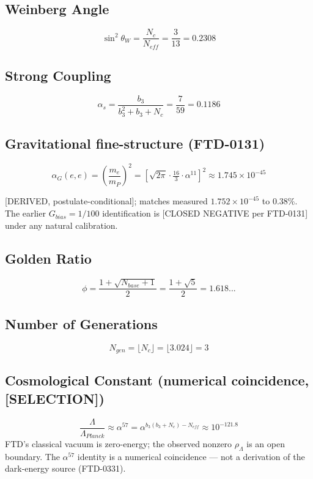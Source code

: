 \documentclass[
  11pt,
  letterpaper,
  twoside,
  openany]{book}
\makeatletter
\let\orig@subsection\subsection
\renewcommand{\subsection}{\needspace{6\baselineskip}\orig@subsection}
\makeatother
\begin{document}
\subsection{Weinberg Angle}\label{weinberg-angle}

\[
\sin^2\theta_W = \frac{N_c}{N_{eff}} = \frac{3}{13} = 0.2308
\]

\subsection{Strong Coupling}\label{strong-coupling}

\[
\alpha_s = \frac{b_3}{b_3^2 + b_3 + N_c} = \frac{7}{59} = 0.1186
\]

\subsection{Gravitational fine-structure
(FTD-0131)}\label{gravitational-fine-structure-ftd-0131-1}

\[
\alpha_G(e,e) = \left(\frac{m_e}{m_P}\right)^2 = \left[\sqrt{2\pi}\cdot\tfrac{16}{3}\cdot\alpha^{11}\right]^2 \approx 1.745 \times 10^{-45}
\]

{[}DERIVED, postulate-conditional{]}; matches measured
\(1.752 \times 10^{-45}\) to 0.38\%. The earlier \(G_{bias} = 1/100\)
identification is {[}CLOSED NEGATIVE per FTD-0131{]} under any natural
calibration.

\subsection{Golden Ratio}\label{golden-ratio}

\[
\phi = \frac{1 + \sqrt{N_{base}+1}}{2} = \frac{1+\sqrt{5}}{2} = 1.618...
\]

\subsection{Number of Generations}\label{number-of-generations-1}

\[
N_{gen} = \lfloor N_c \rfloor = \lfloor 3.024 \rfloor = 3
\]

\subsection{Cosmological Constant (numerical coincidence,
{[}SELECTION{]})}\label{cosmological-constant-numerical-coincidence-selection}

\[
\frac{\Lambda}{\Lambda_{Planck}} \approx \alpha^{57} = \alpha^{b_3(b_3+N_c) - N_{eff}} \approx 10^{-121.8}
\] FTD's classical vacuum is zero-energy; the observed nonzero
\(\rho_\Lambda\) is an open boundary. The \(\alpha^{57}\) identity is a
numerical coincidence --- not a derivation of the dark-energy source
(FTD-0331).
\end{document}
